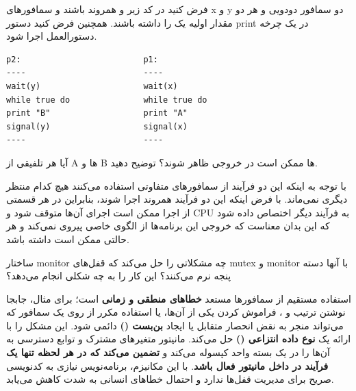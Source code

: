 \documentclass[12pt, answers]{exam}
\begin{document}
\begin{questions}
    \question فرض کنید در کد زیر
     و 
    همروند باشند و سمافورهای x و y دو سمافور دودویی و هر دو مقدار اولیه یک را داشته باشند. همچنین
    فرض کنید دستور print در یک چرخه دستورالعمل اجرا شود.

    \begin{latin}
        \begin{center}
            \begin{lstlisting}[basicstyle=\ttfamily\small]
p2:                         p1:
----                        ----
wait(y)                     wait(x)
while true do               while true do
print "B"                   print "A"
signal(y)                   signal(x)
----                        ----
            \end{lstlisting}
        \end{center}
    \end{latin}

    آیا هر تلفیقی از A ها و B ها ممکن است در خروجی ظاهر شوند؟ توضیح دهید.
    \\
    \begin{solution}
        با توجه به اینکه این دو فرآیند از سمافور‌های متفاوتی استفاده می‌کنند هیچ کدام منتظر دیگری نمی‌ماند.
        با فرض اینکه این دو فرآیند همروند اجرا شوند، بنابراین در هر قسمتی از اجرا ممکن است اجرای آن‌ها متوقف شود
        و CPU به فرآیند دیگر اختصاص داده شود که این بدان معناست که
        خروجی این برنامه‌ها از الگوی خاصی پیروی نمی‌کند و هر حالتی ممکن است داشته باشد.
    \end{solution}

    \pagebreak
    \question
    ساختار monitor چه مشکلاتی را حل می‌کند که قفل‌های mutex و monitor با آنها دسته پنجه نرم می‌کنند؟
    این کار را به چه شکلی انجام می‌دهد؟
    \\
    \begin{solution}
        استفاده مستقیم از سمافورها مستعد \textbf{خطاهای منطقی و زمانی} است؛ برای مثال، جابجا نوشتن ترتیب  و ، فراموش کردن یکی از آن‌ها، یا استفاده مکرر از  روی یک سمافور که می‌تواند منجر به نقض انحصار متقابل یا ایجاد \textbf{بن‌بست ()} دائمی شود.  این مشکل را با ارائه یک \textbf{نوع داده انتزاعی ()} حل می‌کند. مانیتور متغیرهای مشترک و توابع دسترسی به آن‌ها را در یک بسته واحد کپسوله می‌کند و \textbf{تضمین می‌کند که در هر لحظه تنها یک فرآیند در داخل مانیتور فعال باشد}. با این مکانیزم، برنامه‌نویس نیازی به کدنویسی صریح برای مدیریت قفل‌ها ندارد و احتمال خطاهای انسانی به شدت کاهش می‌یابد.
    \end{solution}
    \pagebreak


\end{questions}
\end{document}
